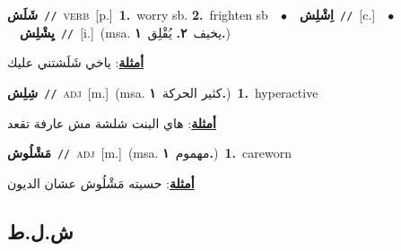 \documentclass[10pt,a4paper,twoside]{article} %
\begin{document}
\begin{multicols}{2}
{\setlength\topsep{0pt}\textbf{\foreignlanguage{arabic}{شَلَش}}\ {\color{gray}\texttt{//}\color{black}}\ \textsc{verb}\ [p.]\ \textbf{1.}~worry sb.  \textbf{2.}~frighten sb\ \ $\bullet$\ \ \setlength\topsep{0pt}\textbf{\foreignlanguage{arabic}{اِشْلِش}}\ {\color{gray}\texttt{//}\color{black}}\ [c.]\ \ $\bullet$\ \ \setlength\topsep{0pt}\textbf{\foreignlanguage{arabic}{يِشْلِش}}\ {\color{gray}\texttt{//}\color{black}}\ [i.]\ \color{gray}(msa. \foreignlanguage{arabic}{يخيف}~\foreignlanguage{arabic}{\textbf{٢.}}  \foreignlanguage{arabic}{يُقْلِق}~\foreignlanguage{arabic}{\textbf{١.}})\color{black}\  \begin{flushright}\color{gray}\foreignlanguage{arabic}{\textbf{\underline{\foreignlanguage{arabic}{أمثلة}}}: ياخي شَلَشتني عليك}\end{flushright}\color{black}} \vspace{2mm}

{\setlength\topsep{0pt}\textbf{\foreignlanguage{arabic}{شِلِش}}\ {\color{gray}\texttt{//}\color{black}}\ \textsc{adj}\ [m.]\ \color{gray}(msa. \foreignlanguage{arabic}{كثير الحركة}~\foreignlanguage{arabic}{\textbf{١.}})\color{black}\ \textbf{1.}~hyperactive\  \begin{flushright}\color{gray}\foreignlanguage{arabic}{\textbf{\underline{\foreignlanguage{arabic}{أمثلة}}}: هاي البنت شلشة مش عارفة تقعد}\end{flushright}\color{black}} \vspace{2mm}

{\setlength\topsep{0pt}\textbf{\foreignlanguage{arabic}{مَشْلُوش}}\ {\color{gray}\texttt{//}\color{black}}\ \textsc{adj}\ [m.]\ \color{gray}(msa. \foreignlanguage{arabic}{مهموم}~\foreignlanguage{arabic}{\textbf{١.}})\color{black}\ \textbf{1.}~careworn\  \begin{flushright}\color{gray}\foreignlanguage{arabic}{\textbf{\underline{\foreignlanguage{arabic}{أمثلة}}}: حسيته مَشْلُوش عشان الديون}\end{flushright}\color{black}} \vspace{2mm}

\vspace{-3mm}
\subsection*{\color{blue}\foreignlanguage{arabic}{ش.ل.ط}\color{blue}{}} 


\end{multicols}
\end{document}
